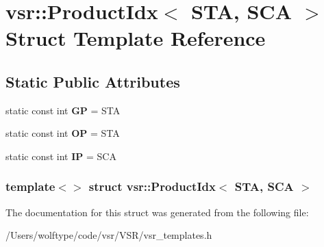 \hypertarget{structvsr_1_1_product_idx_3_01_s_t_a_00_01_s_c_a_01_4}{\section{vsr\-:\-:Product\-Idx$<$ S\-T\-A, S\-C\-A $>$ Struct Template Reference}
\label{structvsr_1_1_product_idx_3_01_s_t_a_00_01_s_c_a_01_4}
}
\subsection*{Static Public Attributes}
\begin{DoxyCompactItemize}
\item 
\hypertarget{structvsr_1_1_product_idx_3_01_s_t_a_00_01_s_c_a_01_4_a6797e2eee6831501ae513b1c1743f533}{static const int {\bfseries G\-P} = S\-T\-A}\label{structvsr_1_1_product_idx_3_01_s_t_a_00_01_s_c_a_01_4_a6797e2eee6831501ae513b1c1743f533}

\item 
\hypertarget{structvsr_1_1_product_idx_3_01_s_t_a_00_01_s_c_a_01_4_a789161cd44a690e5dac65b5ccc040e09}{static const int {\bfseries O\-P} = S\-T\-A}\label{structvsr_1_1_product_idx_3_01_s_t_a_00_01_s_c_a_01_4_a789161cd44a690e5dac65b5ccc040e09}

\item 
\hypertarget{structvsr_1_1_product_idx_3_01_s_t_a_00_01_s_c_a_01_4_a4220fa290e2852c9af36d9889327a49f}{static const int {\bfseries I\-P} = S\-C\-A}\label{structvsr_1_1_product_idx_3_01_s_t_a_00_01_s_c_a_01_4_a4220fa290e2852c9af36d9889327a49f}

\end{DoxyCompactItemize}
\subsubsection*{template$<$$>$ struct vsr\-::\-Product\-Idx$<$ S\-T\-A, S\-C\-A $>$}



The documentation for this struct was generated from the following file\-:\begin{DoxyCompactItemize}
\item 
/\-Users/wolftype/code/vsr/\-V\-S\-R/vsr\-\_\-templates.\-h\end{DoxyCompactItemize}
